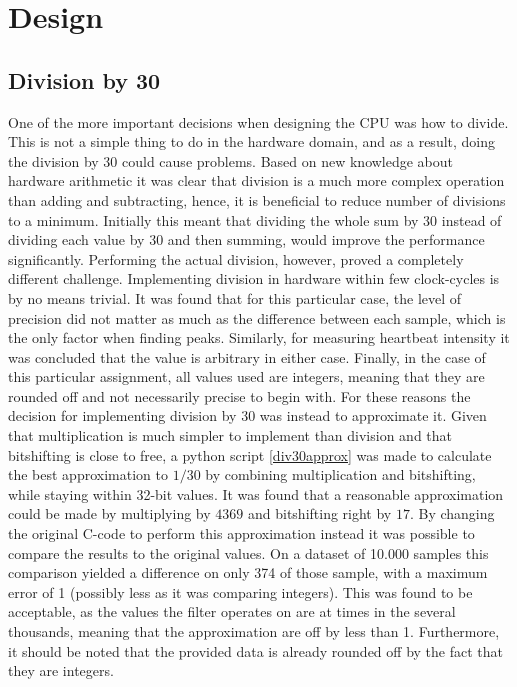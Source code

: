 \documentclass[12pt,a4paper]{article}
\begin{document}
\section{Design}
\subsection{Division by 30}
One of the more important decisions when designing the CPU was how to divide. This is not a simple thing to do in the hardware domain, and as a result, doing the division by 30 could cause problems. Based on new knowledge about hardware arithmetic it was clear that division is a much more complex operation than adding and subtracting, hence, it is beneficial to reduce number of divisions to a minimum. Initially this meant that dividing the whole sum by 30 instead of dividing each value by 30 and then summing, would improve the performance significantly.
Performing the actual division, however, proved a completely different challenge. Implementing division in hardware within few clock-cycles is by no means trivial. It was found that for this particular case, the level of precision did not matter as much as the difference between each sample, which is the only factor when finding peaks. Similarly, for measuring heartbeat intensity it was concluded that the value is arbitrary in either case. Finally, in the case of this particular assignment, all values used are integers, meaning that they are rounded off and not necessarily precise to begin with. For these reasons the decision for implementing division by 30 was instead to approximate it.
	Given that multiplication is much simpler to implement than division and that bitshifting is close to free, a python script \ref{div30approx} was made to calculate the best approximation to $1/30$ by combining multiplication and bitshifting, while staying within 32-bit values.
	It was found that a reasonable approximation could be made by multiplying by $4369$ and bitshifting right by $17$. By changing the original C-code to perform this approximation instead it was possible to compare the results to the original values. On a dataset of 10.000 samples this comparison yielded a difference on only 374 of those sample, with a maximum error of 1 (possibly less as it was comparing integers). This was found to be acceptable, as the values the filter operates on are at times in the several thousands, meaning that the approximation are off by less than 1\textperthousand. Furthermore, it should be noted that the provided data is already rounded off by the fact that they are integers.\\
\end{document}
